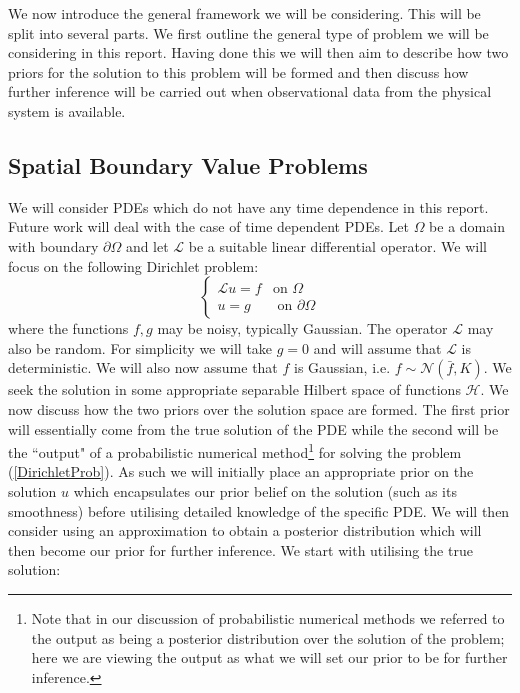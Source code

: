 \vspace{8pt}We now introduce the general framework we will be considering. This will be split into several parts. We first outline the general type of problem we will be considering in this report. Having done this we will then aim to describe how two priors for the solution to this problem will be formed and then discuss how further inference will be carried out when observational data from the physical system is available.


\subsection{Spatial Boundary Value Problems}

We will consider PDEs which do not have any time dependence in this report. Future work will deal with the case of time dependent PDEs. Let $\Omega$ be a domain with boundary $\partial\Omega$ and let $\mathcal{L}$ be a suitable linear differential operator. We will focus on the following Dirichlet problem:
\begin{equation}
\label{DirichletProb}
    \left\{
    \begin{array}{cc}
        \mathcal{L}u=f & \text{on } \Omega  \\
         u = g  & \text{ on } \partial\Omega
    \end{array}
    \right.
\end{equation}
where the functions $f,g$ may be noisy, typically Gaussian. The operator $\mathcal{L}$ may also be random. For simplicity we will take $g=0$ and will assume that $\mathcal{L}$ is deterministic. We will also now assume that $f$ is Gaussian, i.e. $f\sim\mathcal{N}(\bar{f},K)$. We seek the solution in some appropriate separable Hilbert space of functions $\mathcal{H}$. We now discuss how the two priors over the solution space are formed. The first prior will essentially come from the true solution of the PDE while the second will be the ``output" of a probabilistic numerical method\footnote{Note that in our discussion of probabilistic numerical methods we referred to the output as being a posterior distribution over the solution of the problem; here we are viewing the output as what we will set our prior to be for further inference.} for solving the problem (\ref{DirichletProb}). As such we will initially place an appropriate prior on the solution $u$ which encapsulates our prior belief on the solution (such as its smoothness) before utilising detailed knowledge of the specific PDE. We will then consider using an approximation to obtain a posterior distribution which will then become our prior for further inference. We start with utilising the true solution:

